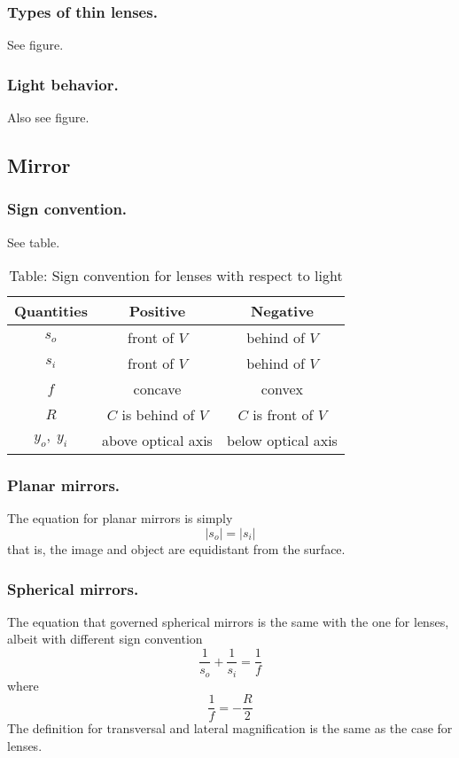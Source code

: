 \documentclass[../../../main.tex]{subfiles}
\begin{document}
\subsubsection*{Types of thin lenses.} See figure.

\subsubsection*{Light behavior.} Also see figure.

\subsection*{Mirror}

\subsubsection*{Sign convention.} See table.
\begin{table}
    \centering
    \caption*{Table: Sign convention for lenses with respect to light}
    \begin{tabular}{ccc }
        \toprule
        Quantities & Positive & Negative\\ 
        \midrule
        $s_o$& front of $V $ & behind of $V $ \\ 
    $s_i$& front of $V $ & behind of $V $\\
    $f$& concave & convex \\
    $R$& $C$ is behind of $V $ & $C$ is front of $V $\\
    $y_o,\;y_i$& above optical axis &below optical axis\\
        \bottomrule
    \end{tabular}
\end{table}

\subsubsection*{Planar mirrors.} The equation for planar mirrors is simply
\begin{equation*}
    |s_o|=|s_i|
\end{equation*}
that is, the image and object  are equidistant from the surface.

\subsubsection*{Spherical mirrors.} The equation that governed spherical mirrors is the same with the one for lenses, albeit with different sign convention
 \begin{equation*}
    \frac{1}{s_o}+\frac{1}{s_i}=\frac{1}{f}
 \end{equation*}
 where
 \begin{equation*}
     \frac{1}{f}=-\frac{R}{2}
 \end{equation*}
The definition for transversal and lateral magnification is the same as the case for lenses. 
\end{document}
